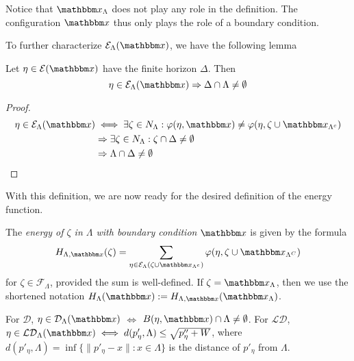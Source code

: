 Notice that $\x_\Lambda$ does not play any role in the definition. The configuration $\x$ thus only plays the role of a boundary condition.

To further characterize $\mathcal E_\Lambda(\x)$, we have the following lemma
\begin{lemma}\label{lemma:horizEset}Let $\eta \in \mathcal E(\x)$ have the finite horizon $\Delta$. Then
	$$\eta \in \mathcal E_\Lambda(\x) \Rightarrow \Delta \cap \Lambda \neq \emptyset$$
\end{lemma}
\begin{proof}
	\begin{align*}
		\eta \in \mathcal E_\Lambda(\x) & \iff \exists \zeta \in N_\Lambda: \varphi(\eta,\x) \neq \varphi(\eta,\zeta \cup \x_{\Lambda^c}) \\
			& \Rightarrow \exists \zeta \in N_\Lambda: \zeta \cap \Delta \neq \emptyset \\
			& \Rightarrow \Lambda \cap \Delta \neq \emptyset
	\end{align*}
\end{proof}


With this definition, we are now ready for the desired definition of the energy function.

\begin{definition}\label{def:energy}
The \textit{energy of $\zeta$ in $\Lambda$ with boundary condition $\x$} is given by the formula
$$H_{\Lambda,\x}(\zeta) = \sum_{\eta \in \mathcal E_\Lambda(\zeta \cup \x_{\Lambda^c})} \varphi(\eta, \zeta \cup \x_{\Lambda^C})$$
for $\zeta \in \mathcal F_{\Lambda}$, provided the sum is well-defined. \newline
If $\zeta = \x_\Lambda$, then we use the shortened notation $H_\Lambda(\x):=H_{\Lambda,\x}(\x_\Lambda)$.
\end{definition}

\begin{remark}
For $\mathcal D$, $\eta \in \mathcal D_\Lambda(\x)$ $\iff$ $B(\eta,\x) \cap \Lambda \neq \emptyset$. \newline
For $\mathcal {LD}$, $\eta \in \mathcal {LD}_\Lambda(\x) \iff d(p'_\eta,\Lambda) \leq \sqrt{p''_\eta + W}$, where $d(p'_\eta,\Lambda) = \inf\{\|p'_\eta - x\|: x \in \Lambda\}$ is the distance of $p'_\eta$ from $\Lambda$.    \newline
\end{remark}

